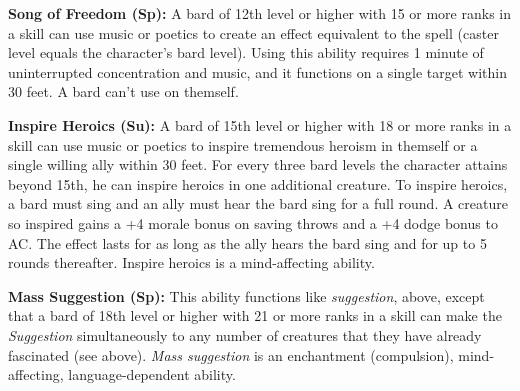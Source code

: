 \textbf{Song of Freedom (Sp):} A bard of 12th level or higher with 15 or more ranks in a  skill can use music or poetics to create an effect equivalent to the  spell (caster level equals the character's bard level). Using this ability requires 1 minute of uninterrupted concentration and music, and it functions on a single target within 30 feet. A bard can't use  on themself.

\textbf{Inspire Heroics (Su):} A bard of 15th level or higher with 18 or more ranks in a  skill can use music or poetics to inspire tremendous heroism in themself or a single willing ally within 30 feet. For every three bard levels the character attains beyond 15th, he can inspire heroics in one additional creature. To inspire heroics, a bard must sing and an ally must hear the bard sing for a full round. A creature so inspired gains a +4 morale bonus on saving throws and a +4 dodge bonus to AC. The effect lasts for as long as the ally hears the bard sing and for up to 5 rounds thereafter. Inspire heroics is a mind-affecting ability.

\textbf{Mass Suggestion (Sp):} This ability functions like \textit{suggestion}, above, except that a bard of 18th level or higher with 21 or more ranks in a  skill can make the \textit{Suggestion} simultaneously to any number of creatures that they have already fascinated (see above). \textit{Mass suggestion} is an enchantment (compulsion), mind-affecting, language-dependent ability.
